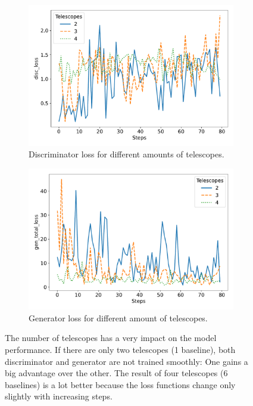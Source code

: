 \begin{figure}
	\centering
	\begin{subfigure}{0.5\linewidth}
		\centering
		\includegraphics[width=\textwidth]{fig/analysis/Plot_N_telescopes_disc_loss.pdf}
		\caption{Discriminator loss for different amounts of telescopes.}
		\label{fig:Plot_telescopes_discloss}
	\end{subfigure}\hfill
	\begin{subfigure}{0.5\linewidth}
		\centering
		\includegraphics[width=\textwidth]{fig/analysis/Plot_N_telescopes_gen_total_loss.pdf}
		\caption{Generator loss for different amount of telescopes.}
		\label{fig:Plot_telescopes_genloss}
	\end{subfigure}\hfill
	\caption{The number of telescopes has a very impact on the model performance. If there are only two telescopes (1 baseline), both discriminator and generator are not trained smoothly: One gains a big advantage over the other. The result of four telescopes (6 baselines) is a lot better because the loss functions change only slightly with increasing steps.}
	\label{fig:Plot_telescopes_loss}
\end{figure}
